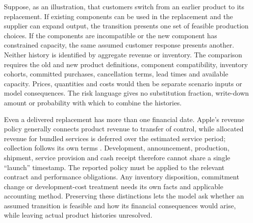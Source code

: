 Suppose, as an illustration, that customers switch from an earlier product to
its replacement. If existing components can be used in the replacement and
the supplier can expand output, the transition presents one set of feasible
production choices. If the components are incompatible or the new component
has constrained capacity, the same assumed customer response presents another.
Neither history is identified by aggregate revenue or inventory. The comparison
requires the old and new product definitions, component compatibility, inventory
cohorts, committed purchases, cancellation terms, lead times and available
capacity. Prices, quantities and costs would then be separate scenario inputs
or model consequences. The risk language gives no substitution fraction,
write-down amount or probability with which to combine the histories.

Even a delivered replacement has more than one financial date. Apple's revenue
policy generally connects product revenue to transfer of control, while
allocated revenue for bundled services is deferred over the estimated service
period; collection follows its own terms
\citep[Note 2, printed p.~35]{apple2024}. Development, announcement, production,
shipment, service provision and cash receipt therefore cannot share a single
``launch'' timestamp. The reported policy must be applied to the relevant
contract and performance obligations. Any inventory disposition, commitment
change or development-cost treatment needs its own facts and applicable
accounting method. Preserving these distinctions lets the model ask whether
an assumed transition is feasible and how its financial consequences would
arise, while leaving actual product histories unresolved.

